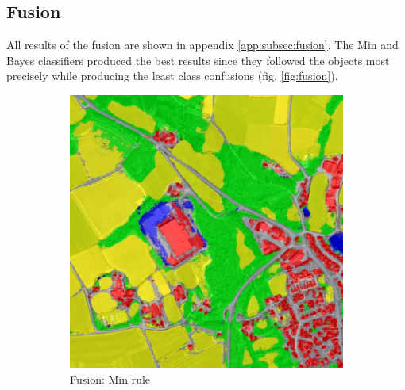 \documentclass[10pt]{article}
\begin{document}
\subsection{Fusion}
All results of the fusion are shown in appendix \ref{app:subsec:fusion}. The Min and Bayes classifiers produced the best results since they followed the objects most precisely while producing the least class confusions (fig. \ref{fig:fusion}).

\begin{figure}[H]
    \centering 
    \begin{subfigure}{0.49\textwidth}
        \centering
        \includegraphics[width=\textwidth]{T41000_30000_classif_Fusion_Min_weighted}
        \caption{Fusion: Min rule}
        \label{fig:fusion_min}
    \end{subfigure}
    \begin{subfigure}{0.49\textwidth}
        \centering

\end{subfigure}
\end{figure}
\end{document}
